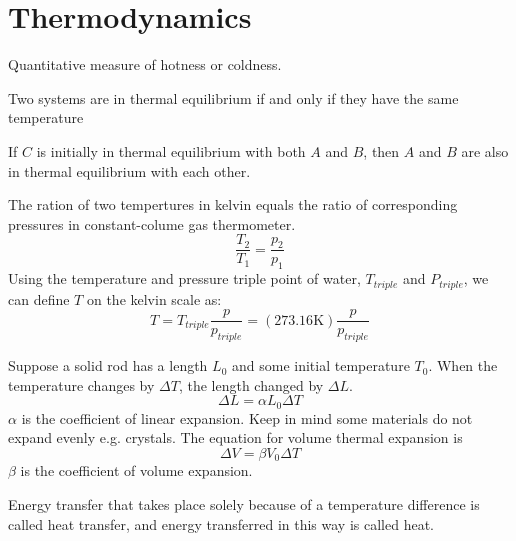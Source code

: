 \documentclass[nobib,notoc]{tufte-handout}
\begin{document}
\section{Thermodynamics}
\begin{defi}[Temperature]
	Quantitative measure of hotness or coldness.
\end{defi}
\begin{defi}
	Two systems are in thermal equilibrium if and only if they have the same temperature
\end{defi}
\begin{defi}
	If \(C\) is initially in thermal equilibrium with both \(A\) and \(B\), then \(A\) and \(B\) are also in thermal equilibrium with each other.
\end{defi}
\begin{defi}
	The ration of two tempertures in kelvin equals the ratio of corresponding pressures in constant-colume gas thermometer.
	\begin{equation*}
		\frac{T_2}{T_1}=\frac{p_2}{p_1}
	\end{equation*}
	Using the temperature and pressure triple point of water, \(T_{triple}\) and \(P_{triple}\), we can define \(T\) on the kelvin scale as:
	\begin{equation*}
		T=T_{triple}\frac{p}{p_{triple}}=(273.16\text{K})\frac{p}{p_{triple}}
	\end{equation*}
\end{defi}
\begin{defi}
	Suppose a solid rod has a length \(L_0\) and some initial temperature \(T_0\). When the temperature changes by \(\Delta T\), the length changed by \(\Delta L\).
	\begin{equation*}
		\Delta L=\alpha L_0\Delta T
	\end{equation*}
	\(\alpha\) is the coefficient of linear expansion. Keep in mind some materials do not expand evenly e.g. crystals. The equation for volume thermal expansion is
	\begin{equation*}
		\Delta V=\beta V_0\Delta T
	\end{equation*}
	\(\beta\) is the coefficient of volume expansion.
\end{defi}
\begin{defi}[Heat]
	Energy transfer that takes place solely because of a temperature difference is called heat transfer, and energy transferred in this way is called heat. 
\end{defi}
\end{document}
